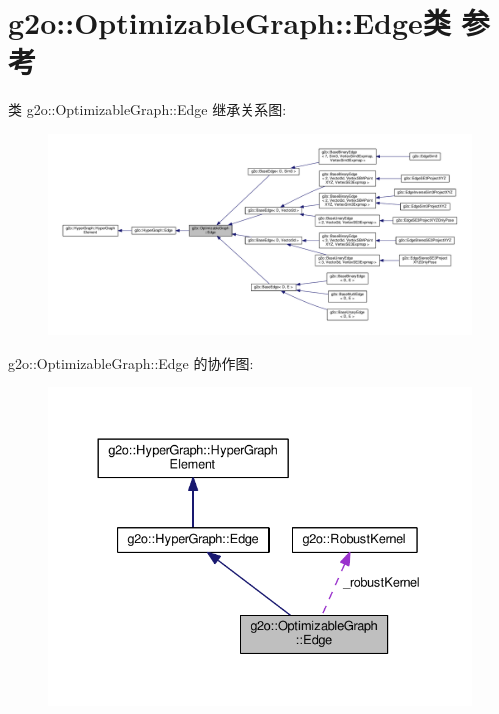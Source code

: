 \hypertarget{classg2o_1_1OptimizableGraph_1_1Edge}{\section{g2o\-:\-:Optimizable\-Graph\-:\-:Edge类 参考}
\label{classg2o_1_1OptimizableGraph_1_1Edge}
}


类 g2o\-:\-:Optimizable\-Graph\-:\-:Edge 继承关系图\-:
\nopagebreak
\begin{figure}[H]
\begin{center}
\leavevmode
\includegraphics[width=350pt]{classg2o_1_1OptimizableGraph_1_1Edge__inherit__graph}
\end{center}
\end{figure}


g2o\-:\-:Optimizable\-Graph\-:\-:Edge 的协作图\-:
\nopagebreak
\begin{figure}[H]
\begin{center}
\leavevmode
\includegraphics[width=333pt]{classg2o_1_1OptimizableGraph_1_1Edge__coll__graph}
\end{center}
\end{figure}
